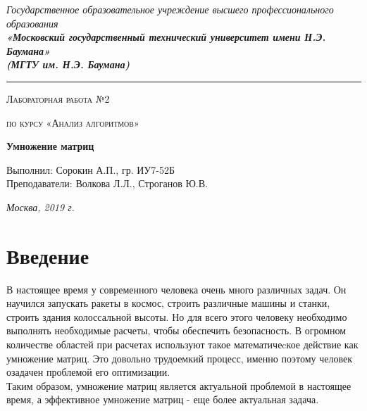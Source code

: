 \documentclass[12pt, a4paper]{report}
\begin{document}
    \begin{titlepage}

        \begin{center}
            \Large
            {\sl Государственное образовательное учреждение высшего профессионального образования\\
            {\bf«Московский государственный технический университет имени Н.Э. Баумана»\\
				(МГТУ им. Н.Э. Баумана)}}
				\noindent\rule{\textwidth}{2pt}
            \vspace{3cm}

			{\scshape\LARGE Лабораторная работа №2 \par}
			\vspace{0.5cm}	
			{\scshape\LARGE по курсу «Анализ алгоритмов» \par}
			\vspace{1.5cm}
			{\huge\bfseries Умножение матриц \par}
			\vspace{2cm}
			\Large Выполнил: Сорокин А.П., гр. ИУ7-52Б\\
			\vspace{0.5cm}
			{\Large Преподаватели: Волкова Л.Л., Строганов Ю.В.}
		
			\vfill
			\Large \textit {Москва, 2019 г.}
            
        \end{center}

    \end{titlepage}
	
	\tableofcontents

	\chapter*{Введение}
	
	\hspace{1cm}В настоящее время у современного человека очень много различных задач. Он научился запускать ракеты в космос, строить различные машины и станки, строить здания колоссальной высоты. Но для всего этого человеку необходимо выполнять необходимые расчеты, чтобы обеспечить безопасность. В огромном количестве областей при расчетах используют такое математичеcкое действие как умножение матриц. Это довольно трудоемкий процесс, именно поэтому человек озадачен проблемой его оптимизации.\\
	Таким образом, умножение матриц является актуальной проблемой в настоящее время, а эффективное умножение матриц - еще более актуальная задача.
\end{document}
